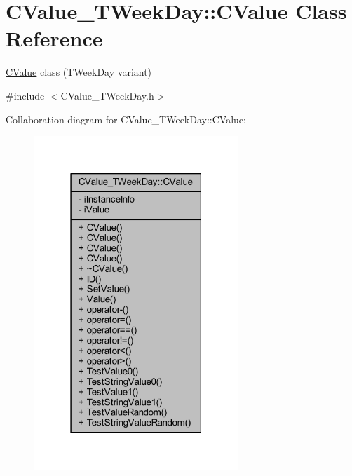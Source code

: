 \hypertarget{class_c_value___t_week_day_1_1_c_value}{}\section{C\+Value\+\_\+\+T\+Week\+Day\+:\+:C\+Value Class Reference}
\label{class_c_value___t_week_day_1_1_c_value}


\hyperlink{class_c_value___t_week_day_1_1_c_value}{C\+Value} class ({\ttfamily T\+Week\+Day} variant)  




{\ttfamily \#include $<$C\+Value\+\_\+\+T\+Week\+Day.\+h$>$}



Collaboration diagram for C\+Value\+\_\+\+T\+Week\+Day\+:\+:C\+Value\+:
\nopagebreak
\begin{figure}[H]
\begin{center}
\leavevmode
\includegraphics[width=219pt]{class_c_value___t_week_day_1_1_c_value__coll__graph}
\end{center}
\end{figure}

